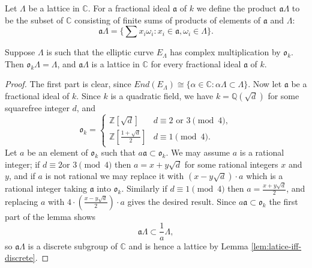 Let $\Lambda$ be a lattice in $\mathbb{C}$.  For a fractional ideal $\mathfrak{a}$ of
$k$ we define the product $\mathfrak{a}\Lambda$ to be the subset of $\mathbb{C}$
consisting of finite sums of products of elements of $\mathfrak{a}$ and $\Lambda$:
\begin{equation*}
  \mathfrak{a}\Lambda = \{ \sum x_{i}\omega_{i} \colon x_{i} \in \mathfrak{a},
  \omega_{i} \in \Lambda\}.
\end{equation*}

\begin{lem}
  \label{lem:o.lambda-equals-lamba}
  Suppose $\Lambda$ is such that the elliptic curve $E_{\Lambda}$ has complex
  multiplication by $\mathfrak{o}_{k}$.  Then $\mathfrak{o}_{k}\Lambda = \Lambda$,
  and $\mathfrak{a}\Lambda$ is a lattice in $\mathbb{C}$ for every fractional ideal
  $\mathfrak{a}$ of $k$.
\end{lem}
\begin{proof}
  The first part is clear, since $End(E_{\Lambda}) \cong \{\alpha \in \mathbb{C}
  \colon \alpha\Lambda \subset \Lambda \}$.  Now let $\mathfrak{a}$ be a fractional
  ideal of $k$.  Since $k$ is a quadratic field, we have $k = \mathbb{Q}(\sqrt{d})$
  for some squarefree integer $d$, and
  \begin{equation*}
    \mathfrak{o}_{k} =
    \begin{cases}
      \mathbb{Z}[\sqrt{d}] & d \equiv 2 \text{ or } 3 \pmod{4} ,\\
      \mathbb{Z}[\frac{1 + \sqrt{d}}{2}] & d \equiv 1 \pmod{4}.
    \end{cases}
  \end{equation*}
  Let $a$ be an element of $\mathfrak{o}_{k}$ such that $a\mathfrak{a} \subset
  \mathfrak{o}_{k}$.  We may assume $a$ is a rational integer; if $d \equiv 2 \text{
    or } 3 \pmod{4}$ then $a = x + y\sqrt{d}$ for some rational integers $x$ and $y$,
  and if $a$ is not rational we may replace it with $(x - y\sqrt{d})\cdot a$ which is
  a rational integer taking $\mathfrak{a}$ into $\mathfrak{o}_{k}$.  Similarly if $d
  \equiv 1 \pmod{4}$ then $a = \frac{x + y\sqrt{d}}{2}$, and replacing $a$ with
  $4\cdot (\frac{x - y\sqrt{d}}{2})\cdot a$ gives the desired result.  Since
  $a\mathfrak{a} \subset \mathfrak{o}_{k}$ the first part of the lemma shows
  \begin{equation*}
    \mathfrak{a}\Lambda \subset \frac{1}{a}\Lambda,
  \end{equation*}
  so $\mathfrak{a}\Lambda$ is a discrete subgroup of $\mathbb{C}$ and is hence a
  lattice by Lemma \ref{lem:latice-iff-discrete}.
\end{proof}

